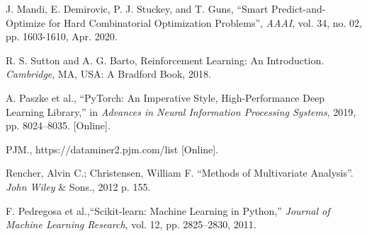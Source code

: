 \documentclass[journal]{IEEEtran}
\begin{document}
\begin{thebibliography}{2}
J. Mandi, E. Demirovic, P. J. Stuckey, and T. Guns, “Smart Predict-and-Optimize for Hard Combinatorial Optimization Problems”, \emph{AAAI}, vol. 34, no. 02, pp. 1603-1610, Apr. 2020.

R. S. Sutton and A. G. Barto, Reinforcement Learning: An Introduction. \emph{Cambridge}, MA, USA: A Bradford Book, 2018.


A. Paszke et al., “PyTorch: An Imperative Style, High-Performance Deep Learning Library,” in \emph{Advances in Neural Information Processing Systems}, 2019, pp. 8024–8035. [Online].

PJM., https://dataminer2.pjm.com/list [Online].

Rencher, Alvin C.; Christensen, William F. ``Methods of Multivariate Analysis''. \emph{John Wiley} \& Sons., 2012 p. 155.

F. Pedregosa et al.,``Scikit-learn: Machine Learning in Python,” \emph{Journal of Machine Learning Research}, vol. 12, pp. 2825–2830, 2011.



\end{thebibliography}
\end{document}
